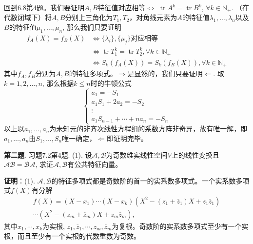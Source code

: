 {回到6.8第4题。我们要证明$A, B$特征值对应相等$\Longleftrightarrow$ $\operatorname{tr} A^k = \operatorname{tr} B^k$, $\forall k \in \mathbb{N}_+$. （在代数闭域下）将$A,B$分别上三角化为$T_1, T_2$，对角线元素为$A$的特征值$\lambda_1,\ldots,\lambda_n$以及$B$的特征值$\mu_1,\ldots,\mu_n$, 那么我们只要证明
\begin{align*}
f_A(X) = f_B(X) & \Longleftrightarrow \{\lambda_i\}, \{\mu_j\}\text{对应相等} \\
& \Longleftrightarrow \operatorname{tr} T_1^k = \operatorname{tr} T_2^k, \forall k \in \mathbb{N}_+ \\
& \Longleftrightarrow S_k(f_A(X)) = S_k(f_B(X)), \forall k \in \mathbb{N}_+
\end{align*}
其中$f_A, f_B$分别为$A,B$的特征多项式。$\Longrightarrow$是显然的，我们只要证明$\Longleftarrow$. 取$k = 1, 2, \ldots, n$, 那么根据$k \leqslant n$时的牛顿公式
$$
\begin{cases}
a_1 = -S_1 \\
a_1S_1 + 2a_2 = -S_2 \\
\vdots \\
a_1S_{n-1} + \cdots + na_n = -S_n
\end{cases}
$$
以上以$a_1,\ldots,a_n$为未知元的非齐次线性方程组的系数方阵非奇异，故有唯一解，即$a_1,\ldots,a_n$由$S_1,\ldots,S_n$唯一确定，$\Longleftarrow$即证明完毕。


\newpageorvspace


{\bf 第二题}. 习题7.2第4题. (1). 设$\mathscr{A,B}$为奇数维实线性空间$V$上的线性变换且$\mathscr{AB} = \mathscr{BA}$, 求证$\mathscr{A,B}$有公共特征向量。

\newpageorvspace

{\bf 证明}：(1). $\mathscr{A,B}$的特征多项式都是奇数阶的首一的实系数多项式。一个实系数多项式$f(X)$有分解
\begin{multline*}
f(X) = (X-x_1) \cdots (X-x_k) (X^2 - (z_1+\overline{z}_1)X + z_1\overline{z}_1) \\
\cdots (X^2 - (z_m+\overline{z}_m)X + z_m\overline{z}_m),
\end{multline*}
其中$x_1, \cdots, x_k$为实根, $z_1, \overline{z}_1, \cdots, z_m, \overline{z}_m$为复根。奇数阶的实系数多项式至少有一个实根，而且至少有一个实根的代数重数为奇数。

}
